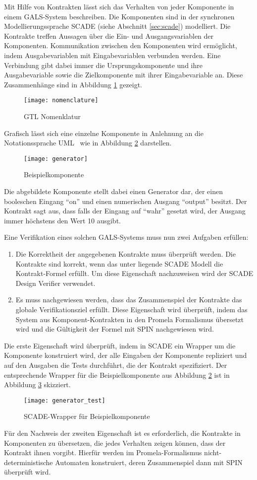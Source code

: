 Mit Hilfe von Kontrakten lässt sich das Verhalten von jeder Komponente in einem GALS-System beschreiben.
Die Komponenten sind in der synchronen Modellierungssprache SCADE (siehe Abschnitt \ref{sec:scade}) modelliert.
Die Kontrakte treffen Aussagen über die Ein- und Ausgangsvariablen der Komponenten.
Kommunikation zwischen den Komponenten wird ermöglicht, indem Ausgabevariablen mit Eingabevariablen verbunden werden.
Eine Verbindung gibt dabei immer die Ursprungskomponente und ihre Ausgabevariable sowie die Zielkomponente mit ihrer Eingabevariable an.
Diese Zusammenhänge sind in Abbildung \ref{fig:nomenclature} gezeigt.
\begin{figure}
  \centering
  \texttt{[image: nomenclature]}
  \caption{GTL Nomenklatur}
  \label{fig:nomenclature}
\end{figure}

Grafisch lässt sich eine einzelne Komponente in Anlehnung an die Notationssprache UML~\cite{uml} wie in Abbildung \ref{fig:example_generator} darstellen.
\begin{figure}
  \centering
  \texttt{[image: generator]}
  \caption{Beispielkomponente}
  \label{fig:example_generator}
\end{figure}
Die abgebildete Komponente stellt dabei einen Generator dar, der einen booleschen Eingang "`on"' und einen numerischen Ausgang "`output"' besitzt.
Der Kontrakt sagt aus, dass falls der Eingang auf "`wahr"' gesetzt wird, der Ausgang immer höchstens den Wert 10 ausgibt.

Eine Verifikation eines solchen GALS-Systems muss nun zwei Aufgaben erfüllen:
\begin{enumerate}
\item Die Korrektheit der angegebenen Kontrakte muss überprüft werden.
  Die Kontrakte sind korrekt, wenn das unter liegende SCADE Modell die Kontrakt-Formel erfüllt.
  Um diese Eigenschaft nachzuweisen wird der SCADE Design Verifier verwendet.
\item Es muss nachgewiesen werden, dass das Zusammenspiel der Kontrakte das globale Verifikationsziel erfüllt.
  Diese Eigenschaft wird überprüft, indem das System aus Komponent-Kontrakten in den Promela Formalismus übersetzt wird und die Gültigkeit der Formel mit SPIN nachgewiesen wird.
\end{enumerate}

Die erste Eigenschaft wird überprüft, indem in SCADE ein Wrapper um die Komponente konstruiert wird, der alle Eingaben der Komponente repliziert und auf den Ausgaben die Tests durchführt, die der Kontrakt spezifiziert.
Der entsprechende Wrapper für die Beispielkomponente aus Abbildung \ref{fig:example_generator} ist in Abbildung \ref{fig:example_generator_test} skizziert.
\begin{figure}
  \centering
  \texttt{[image: generator\_test]}
  \caption{SCADE-Wrapper für Beispielkomponente}
  \label{fig:example_generator_test}
\end{figure}

Für den Nachweis der zweiten Eigenschaft ist es erforderlich, die Kontrakte in Komponenten zu übersetzen, die jedes Verhalten zeigen können, dass der Kontrakt ihnen vorgibt.
Hierfür werden im Promela-Formalismus nicht-deterministische Automaten konstruiert, deren Zusammenspiel dann mit SPIN überprüft wird.